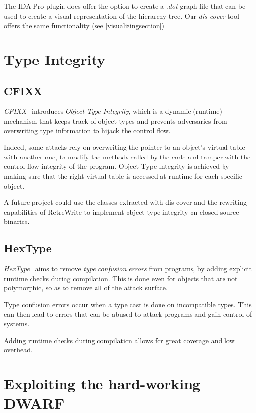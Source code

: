 \documentclass[a4paper,11pt,oneside]{report}
\begin{document}
The IDA Pro plugin does offer the option to create a \emph{.dot} graph file
that can be used to create a visual representation of the hierarchy tree.
Our \emph{dis-cover} tool offers the same functionality (see
\autoref{visualizingsection})


\section{Type Integrity}

\subsection{CFIXX}
\label{cfixx}

\emph{CFIXX}~\cite{cfixx} introduces \emph{Object Type Integrity}, which
is a dynamic (runtime) mechanism that keeps track of object types and prevents
adversaries from overwriting type information to hijack the control flow.

Indeed, some attacks rely on overwriting the pointer to an object's virtual
table with another one, to modify the methods called by the code and tamper
with the control flow integrity of the program.
Object Type Integrity is achieved by making sure that the right virtual table is
accessed at runtime for each specific object.

A future project could use the classes extracted with dis-cover and the
rewriting capabilities of RetroWrite to implement object type integrity on
closed-source binaries.

\subsection{HexType}
\label{hextype}

\emph{HexType}~\cite{hextype} aims to remove \emph{type confusion errors}
from programs, by adding explicit runtime checks during compilation.
This is done even for objects that are not polymorphic, so as to remove all
of the attack surface.

Type confusion errors occur when a type cast is done on incompatible types.
This can then lead to errors that can be abused to attack programs and gain
control of systems.

Adding runtime checks during compilation allows for great coverage and low
overhead.


\section{Exploiting the hard-working DWARF}
\end{document}
